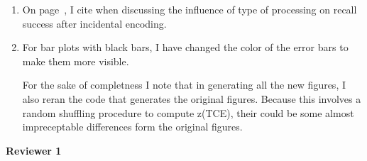 \documentclass[12pt]{article}
\begin{document}
\begin{enumerate}
\item
	On page~\pageref{newcite}, I cite  when discussing the influence of type of processing on recall success after incidental encoding.

\item
	For bar plots with black bars, I have changed the color of the error bars to make them more visible. 

	For the sake of completness I note that in generating all the new figures, I also reran the code that generates the original figures. Because this involves a random shuffling procedure to compute z(TCE), their could be some almost impreceptable differences form the original figures. 


\end{enumerate}


\vspace{20pt}

\textbf{\large{Reviewer 1}}
\end{document}
